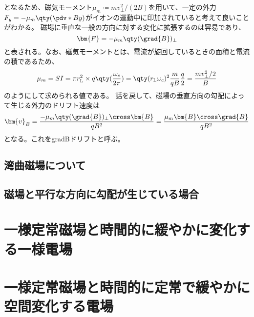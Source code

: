 となるため、磁気モーメント$\mu_m \coloneqq mv^2_{\perp}/(2B)$を用いて、一定の外力$F_y = -\mu_m\qty(\pdv*{B}{y})$がイオンの運動中に印加されていると考えて良いことがわかる。
磁場に垂直な一般の方向に対する変化に拡張するのは容易であり、
\begin{equation}
	\bm{F} = -\mu_m\qty(\grad{B})_{\perp}
\end{equation}
と表される。なお、磁気モーメントとは、電流が旋回しているときの面積と電流の積であるため、
\begin{equation}
	\mu_m = SI = \pi r_{\text{L}}^2\times q\qty(\frac{\omega_c}{2\pi}) = \qty(r_{\text{L}}\omega_c)^2\frac{m}{qB}\frac{q}{2} = \frac{mv_{\perp}^2/2}{B}
\end{equation}
のようにして求められる値である。
話を戻して、磁場の垂直方向の勾配によって生じる外力のドリフト速度は
\begin{equation}
	\bm{v}_{B} = \frac{-\mu_m\qty(\grad{B})_{\perp}\cross\bm{B}}{qB^2} = \frac{\mu_m\bm{B}\cross\grad{B}}{qB^2}
\end{equation}
となる。これをgradBドリフトと呼ぶ。
\subsection{湾曲磁場について}

\subsection{磁場と平行な方向に勾配が生じている場合}

\section{一様定常磁場と時間的に緩やかに変化する一様電場}
\section{一様定常磁場と時間的に定常で緩やかに空間変化する電場}


